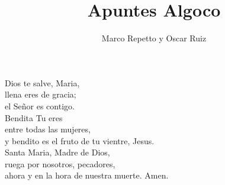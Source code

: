 \documentclass{article}
\title{Apuntes Algoco}
\author{Marco Repetto y Oscar Ruiz}
\date{}
\begin{document}
\maketitle


\vspace*{\fill} %
\begin{center}
{\Large %
Dios te salve, Maria, \\
llena eres de gracia; \\
el Señor es contigo. \\
Bendita Tu eres \\
entre todas las mujeres, \\
y bendito es el fruto de tu vientre, Jesus. \\
Santa Maria, Madre de Dios, \\
ruega por nosotros, pecadores, \\
ahora y en la hora de nuestra muerte. Amen.
}
\end{center}
\vspace*{\fill} %
\newpage
\tableofcontents







\end{document}
